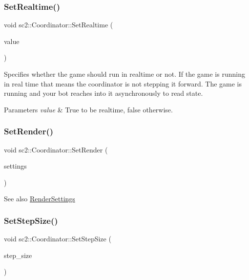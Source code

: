 \subsubsection{\texorpdfstring{Set\+Realtime()}{SetRealtime()}}
{\footnotesize\ttfamily void sc2\+::\+Coordinator\+::\+Set\+Realtime (\begin{DoxyParamCaption}\item[{bool}]{value }\end{DoxyParamCaption})}

Specifies whether the game should run in realtime or not. If the game is running in real time that means the coordinator is not stepping it forward. The game is running and your bot reaches into it asynchronously to read state. 
\begin{DoxyParams}{Parameters}
{\em value} & True to be realtime, false otherwise. \\
\hline
\end{DoxyParams}
\mbox{\label{classsc2_1_1_coordinator_ace8a0630c6b61d28e81c94bbebad3d7d}} 
\subsubsection{\texorpdfstring{Set\+Render()}{SetRender()}}
{\footnotesize\ttfamily void sc2\+::\+Coordinator\+::\+Set\+Render (\begin{DoxyParamCaption}\item[{const \hyperlink{structsc2_1_1_render_settings}{Render\+Settings} \&}]{settings }\end{DoxyParamCaption})}

\begin{DoxySeeAlso}{See also}
\hyperlink{structsc2_1_1_render_settings}{Render\+Settings} 
\end{DoxySeeAlso}
\mbox{\label{classsc2_1_1_coordinator_a7cea718f571effbe25b771315628c685}} 
\subsubsection{\texorpdfstring{Set\+Step\+Size()}{SetStepSize()}}
{\footnotesize\ttfamily void sc2\+::\+Coordinator\+::\+Set\+Step\+Size (\begin{DoxyParamCaption}\item[{int}]{step\+\_\+size }\end{DoxyParamCaption})}

